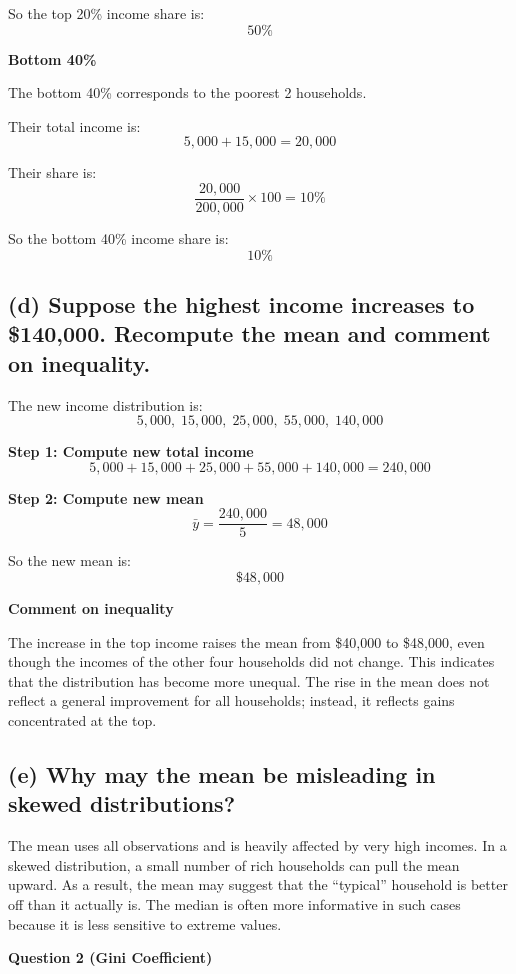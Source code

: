 \documentclass[12pt]{article}
\begin{document}
So the top 20\% income share is:
\[
\boxed{50\%}
\]

\textbf{Bottom 40\%}

The bottom 40\% corresponds to the poorest 2 households.

Their total income is:
\[
5{,}000 + 15{,}000 = 20{,}000
\]

Their share is:
\[
\frac{20{,}000}{200{,}000} \times 100 = 10\%
\]

So the bottom 40\% income share is:
\[
\boxed{10\%}
\]

\subsection*{(d) Suppose the highest income increases to \$140,000. Recompute the mean and comment on inequality.}

The new income distribution is:
\[
5{,}000,\; 15{,}000,\; 25{,}000,\; 55{,}000,\; 140{,}000
\]

\textbf{Step 1: Compute new total income}
\[
5{,}000 + 15{,}000 + 25{,}000 + 55{,}000 + 140{,}000 = 240{,}000
\]

\textbf{Step 2: Compute new mean}
\[
\bar{y} = \frac{240{,}000}{5} = 48{,}000
\]

So the new mean is:
\[
\boxed{\$48{,}000}
\]

\textbf{Comment on inequality}

The increase in the top income raises the mean from \$40,000 to \$48,000, even though the incomes of the other four households did not change. This indicates that the distribution has become more unequal. The rise in the mean does not reflect a general improvement for all households; instead, it reflects gains concentrated at the top.

\subsection*{(e) Why may the mean be misleading in skewed distributions?}

The mean uses all observations and is heavily affected by very high incomes. In a skewed distribution, a small number of rich households can pull the mean upward. As a result, the mean may suggest that the ``typical'' household is better off than it actually is. The median is often more informative in such cases because it is less sensitive to extreme values.

\textbf{Question 2 (Gini Coefficient)}
\end{document}
